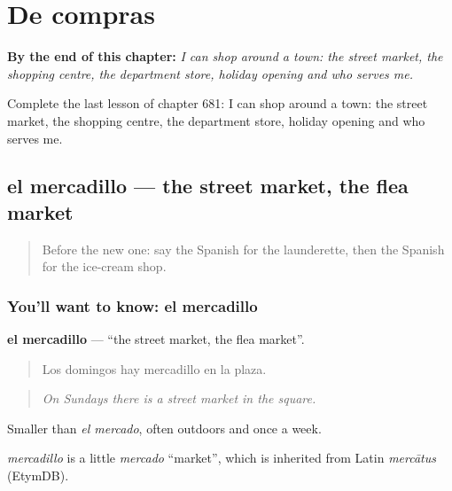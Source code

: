
\chapter{De compras}
\label{ch:es-de-compras}

\begin{chapteropening}
\textbf{By the end of this chapter:} \emph{I can shop around a town: the street market, the shopping centre, the department store, holiday opening and who serves me.}

Complete the last lesson of chapter 681: I can shop around a town: the street market, the shopping centre, the department store, holiday opening and who serves me.
\end{chapteropening}

\section[el mercadillo]{el mercadillo — the street market, the flea market}

\label{lesson:ES-C681-mercadillo}



\begin{quote}
Before the new one: say the Spanish for the launderette, then the Spanish for the ice-cream shop.
\end{quote}

\subsection*{You'll want to know: el mercadillo}
\textbf{el mercadillo} — \textquotedblleft{}the street market, the flea market\textquotedblright{}.

\begin{quote}
Los domingos hay mercadillo en la plaza.
\end{quote}

\begin{quote}
\emph{On Sundays there is a street market in the square.}
\end{quote}

Smaller than \emph{el mercado}, often outdoors and once a week.

\begin{cousinweb}
\emph{mercadillo} is a little \emph{mercado} \textquotedblleft{}market\textquotedblright{}, which is inherited from Latin \emph{mercātus} (EtymDB).
\end{cousinweb}

